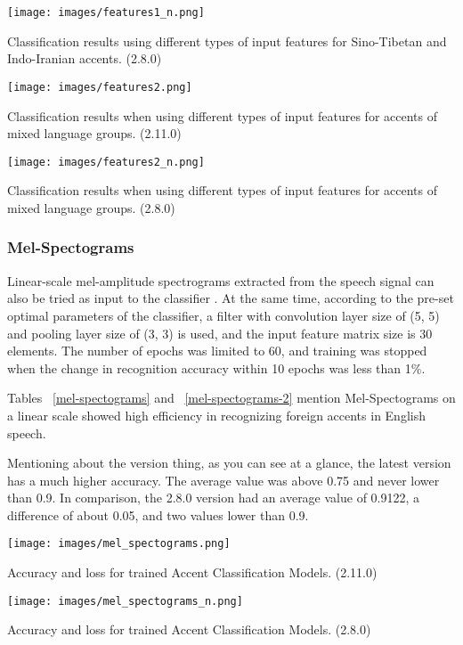 \documentclass[ams]{U-AizuGT}
\begin{document}
\begin{table}[h]
    \centering
    \texttt{[image: images/features1\_n.png]}
    \caption{Classification results using different types of input features for Sino-Tibetan and Indo-Iranian accents. (2.8.0)}
    \label{features1-2}
\end{table}
\begin{table}[h]
    \centering
    \texttt{[image: images/features2.png]}
    \caption{ Classification results when using different types of input features for accents of mixed language groups. (2.11.0)}
    \label{features2}
\end{table}
\begin{table}[h]
    \centering
    \texttt{[image: images/features2\_n.png]}
    \caption{ Classification results when using different types of input features for accents of mixed language groups. (2.8.0)}
    \label{features2-2}
\end{table}
\clearpage
\subsubsection{Mel-Spectograms}
Linear-scale mel-amplitude spectrograms extracted from the speech signal can also be tried as input to the classifier \cite{Veranika:lang}. At the same time, according to the pre-set optimal parameters of the classifier, a filter with convolution layer size of (5, 5) and pooling layer size of (3, 3) is used, and the input feature matrix size is 30 elements. The number of epochs was limited to 60, and training was stopped when the change in recognition accuracy within 10 epochs was less than 1\%.\par
Tables ~\ref{mel-spectograms} and ~\ref{mel-spectograms-2} mention Mel-Spectograms on a linear scale showed high efficiency in recognizing foreign accents in English speech. \par
Mentioning about the version thing, as you can see at a glance, the latest version has a much higher accuracy. The average value was above 0.75 and never lower than 0.9. In comparison, the 2.8.0 version had an average value of 0.9122, a difference of about 0.05, and two values lower than 0.9.
\begin{table}[h]
    \centering
    \texttt{[image: images/mel\_spectograms.png]}
    \caption{Accuracy and loss for trained Accent Classification Models. (2.11.0)}
    \label{mel-spectograms}
\end{table}
\begin{table}[h]
    \centering
    \texttt{[image: images/mel\_spectograms\_n.png]}
    \caption{Accuracy and loss for trained Accent Classification Models. (2.8.0)}
    \label{mel-spectograms-2}
\end{table}
\end{document}
